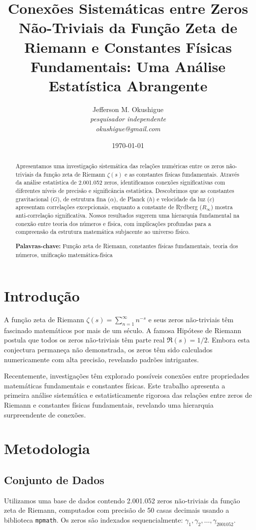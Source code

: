 \documentclass[11pt,a4paper]{article}
\title{\textbf{Conexões Sistemáticas entre Zeros Não-Triviais da Função Zeta de Riemann e Constantes Físicas Fundamentais: Uma Análise Estatística Abrangente}}
\author{
Jefferson M. Okushigue\\
\textit{pesquisador independente}\\
\textit{okushigue@gmail.com}
}
\date{\today}
\begin{document}
\maketitle

\begin{abstract}
Apresentamos uma investigação sistemática das relações numéricas entre os zeros não-triviais da função zeta de Riemann $\zeta(s)$ e as constantes físicas fundamentais. Através da análise estatística de 2.001.052 zeros, identificamos conexões significativas com diferentes níveis de precisão e significância estatística. Descobrimos que as constantes gravitacional ($G$), de estrutura fina ($\alpha$), de Planck ($h$) e velocidade da luz ($c$) apresentam correlações excepcionais, enquanto a constante de Rydberg ($R_\infty$) mostra anti-correlação significativa. Nossos resultados sugerem uma hierarquia fundamental na conexão entre teoria dos números e física, com implicações profundas para a compreensão da estrutura matemática subjacente ao universo físico.

\textbf{Palavras-chave:} Função zeta de Riemann, constantes físicas fundamentais, teoria dos números, unificação matemática-física
\end{abstract}

\section{Introdução}

A função zeta de Riemann $\zeta(s) = \sum_{n=1}^{\infty} n^{-s}$ e seus zeros não-triviais têm fascinado matemáticos por mais de um século. A famosa Hipótese de Riemann postula que todos os zeros não-triviais têm parte real $\Re(s) = 1/2$. Embora esta conjectura permaneça não demonstrada, os zeros têm sido calculados numericamente com alta precisão, revelando padrões intrigantes.

Recentemente, investigações têm explorado possíveis conexões entre propriedades matemáticas fundamentais e constantes físicas. Este trabalho apresenta a primeira análise sistemática e estatisticamente rigorosa das relações entre zeros de Riemann e constantes físicas fundamentais, revelando uma hierarquia surpreendente de conexões.

\section{Metodologia}

\subsection{Conjunto de Dados}
Utilizamos uma base de dados contendo 2.001.052 zeros não-triviais da função zeta de Riemann, computados com precisão de 50 casas decimais usando a biblioteca \texttt{mpmath}. Os zeros são indexados sequencialmente: $\gamma_1, \gamma_2, \ldots, \gamma_{2001052}$.
\end{document}
